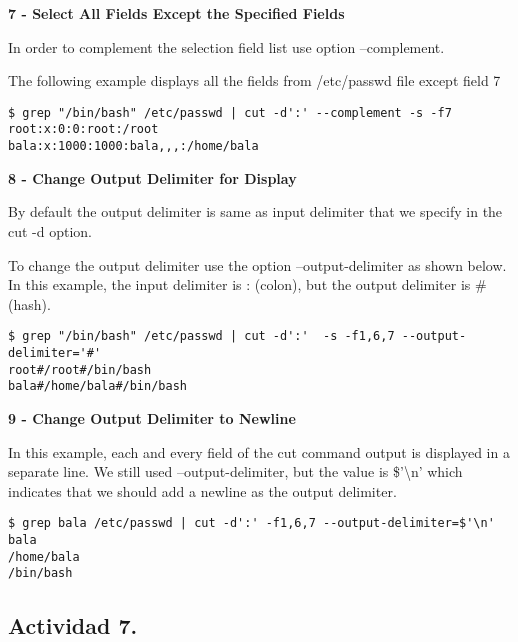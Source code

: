 \documentclass[a4paper,11pt,spanish]{article} %
\newenvironment{myscriptlisting}
{\begin{list}{}{\setlength{\leftmargin}{1em}}\item\scriptsize\bfseries}
{\end{list}}
\begin{document}
\textbf{7 - Select All Fields Except the Specified Fields}

In order to complement the selection field list use option –complement.

The following example displays all the fields from /etc/passwd file except field 7

\begin{myscriptlisting}
 \begin{verbatim}
$ grep "/bin/bash" /etc/passwd | cut -d':' --complement -s -f7
root:x:0:0:root:/root
bala:x:1000:1000:bala,,,:/home/bala
 \end{verbatim}
\end{myscriptlisting}

\textbf{8 - Change Output Delimiter for Display}

By default the output delimiter is same as input delimiter that we specify in the cut -d option.

To change the output delimiter use the option –output-delimiter as shown below. 
In this example, the input delimiter is : (colon), but the output delimiter is \# (hash).

\begin{myscriptlisting}
 \begin{verbatim}
$ grep "/bin/bash" /etc/passwd | cut -d':'  -s -f1,6,7 --output-delimiter='#'
root#/root#/bin/bash
bala#/home/bala#/bin/bash
 \end{verbatim}
\end{myscriptlisting}

\textbf{9 - Change Output Delimiter to Newline}

In this example, each and every field of the cut command output is displayed in 
a separate line. We still used –output-delimiter, but the value is \$’\textbackslash n’ which 
indicates that we should add a newline as the output delimiter.

\begin{myscriptlisting}
 \begin{verbatim}
$ grep bala /etc/passwd | cut -d':' -f1,6,7 --output-delimiter=$'\n'
bala
/home/bala
/bin/bash
 \end{verbatim}
\end{myscriptlisting}

\cite{thegeekstuff2}

\subsection{Actividad 7.}
\end{document}

